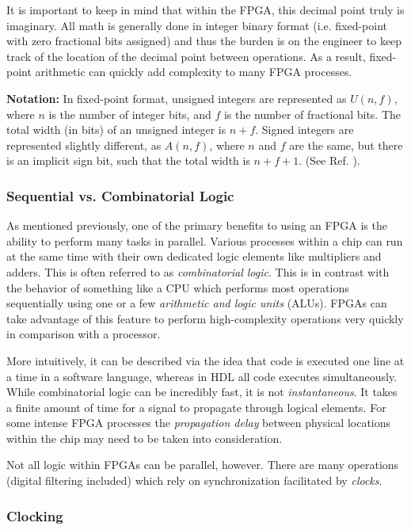 \documentclass[reprint,amsmath,amssymb,aps,pra]{revtex4-2}
\begin{document}
It is important to keep in mind that within the FPGA, this decimal point truly is imaginary. All math is generally done in integer binary format (i.e. fixed-point with zero fractional bits assigned) and thus the burden is on the engineer to keep track of the location of the decimal point between operations. As a result, fixed-point arithmetic can quickly add complexity to many FPGA processes.

\textbf{Notation:} In fixed-point format, unsigned integers are represented as $U(n,f)$, where $n$ is the number of integer bits, and $f$ is the number of fractional bits. The total width (in bits) of an unsigned integer is $n+f$. Signed integers are represented slightly different, as $A(n,f)$, where $n$ and $f$ are the same, but there is an implicit sign bit, such that the total width is $n+f+1$. (See Ref. \cite{fixed-point}).

\subsubsection{Sequential vs. Combinatorial Logic}
As mentioned previously, one of the primary benefits to using an FPGA is the ability to perform many tasks in parallel. Various processes within a chip can run at the same time with their own dedicated logic elements like multipliers and adders. This is often referred to as \textit{combinatorial logic}. This is in contrast with the behavior of something like a CPU which performs most operations sequentially using one or a few \textit{arithmetic and logic units} (ALUs). FPGAs can take advantage of this feature to perform high-complexity operations very quickly in comparison with a processor. 

More intuitively, it can be described via the idea that code is executed one line at a time in a software language, whereas in HDL all code executes simultaneously. While combinatorial logic can be incredibly fast, it is not \textit{instantaneous}. It takes a finite amount of time for a signal to propagate through logical elements. For some intense FPGA processes the \textit{propagation delay} between physical locations within the chip may need to be taken into consideration.

Not all logic within FPGAs can be parallel, however. There are many operations (digital filtering included) which rely on synchronization facilitated by \textit{clocks}.

\subsubsection{Clocking}
\end{document}
